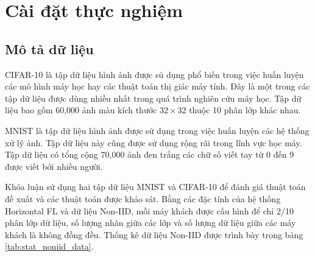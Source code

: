 \chapter{Cài đặt thực nghiệm}
\label{Chapter4}

\section{Mô tả dữ liệu}

CIFAR-10 \cite{cifar-10} là tập dữ liệu hình ảnh được sủ dụng phổ biến trong việc huấn luyện các mô hình máy học hay các thuật toán thị giác máy tính. Đây là một trong các tập dữ liệu được dùng nhiều nhất trong quá trình nghiên cứu máy học. Tập dữ liệu bao gồm 60,000 ảnh màu kích thước $32\times 32$ thuộc 10 phân lớp khác nhau.

MNIST \cite{mnist} là tập dữ liệu hình ảnh được sử dụng trong việc huấn luyện các hệ thống xử lý ảnh. Tập dữ liệu này cũng được sử dụng rộng rãi trong lĩnh vực học máy. Tập dữ liệu có tổng cộng 70,000 ảnh đen trắng các chữ số viết tay từ 0 đến 9 được viết bởi nhiều người.

Khóa luận sử dụng hai tập dữ liệu MNIST và CIFAR-10 để đánh giá thuật toán đề xuất và các thuật toán được khảo sát. Bằng các đặc tính của hệ thống Horizontal FL và dữ liệu Non-IID, mỗi máy khách được cấu hình để chỉ 2/10 phân lớp dữ liệu, số lượng nhãn giữa các lớp và số lượng dữ liệu giữa các máy khách là không đồng đều. Thống kê dữ liệu Non-IID được trình bày trong bảng \ref{tab:stat_noniid_data}.

\begin{table}[H]
    \caption{Thống kê trên hai tập dữ liệu MNIST và CIFAR-10 (dữ liệu Non-IID)}
    \label{tab:stat_noniid_data}
\end{table}

